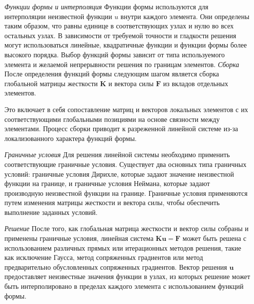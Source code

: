 \textit{Функции формы и интерполяция}
Функции формы используются для интерполяции неизвестной
функции $u$ внутри каждого элемента.
Они определены таким образом, что равны единице в соответствующих
узлах и нулю во всех остальных узлах.
В зависимости от требуемой
точности и гладкости решения могут использоваться линейные,
квадратичные функции и функции формы более высокого порядка.
Выбор функций формы зависит от типа используемого элемента и желаемой
непрерывности решения по границам элементов.
\textit{Сборка}
После определения функций формы следующим шагом является сборка
глобальной матрицы жесткости $\mathbf{K}$ и вектора силы $\mathbf{F}$
из вкладов отдельных элементов.

Это включает в себя сопоставление матриц и векторов локальных
элементов с их соответствующими глобальными
позициями на основе связности между элементами.
Процесс сборки приводит к разреженной линейной системе
из-за локализованного характера функций формы.

\textit{Граничные условия}
Для решения линейной системы необходимо
применить соответствующие граничные условия.
Существует два основных типа граничных условий:
граничные условия Дирихле, которые задают значение
неизвестной функции на границе, и граничные условия Неймана,
которые задают производную неизвестной функции на границе.
Граничные условия применяются путем изменения матрицы
жесткости и вектора силы, чтобы обеспечить выполнение заданных условий.

\textit{Решение}
После того, как глобальная матрица жесткости и вектор силы собраны
и применены граничные условия, линейная система
$\mathbf{K} \mathbf{u} = \mathbf{F}$ может быть решена с использованием
различных прямых или итерационных методов решения, такие как исключение Гаусса,
метод сопряженных градиентов или метод предварительно обусловленных сопряженных градиентов.
Вектор решения $\mathbf{u}$ предоставляет неизвестные значения функции в узлах,
из которых решение может быть интерполировано в пределах
каждого элемента с использованием функций формы.


